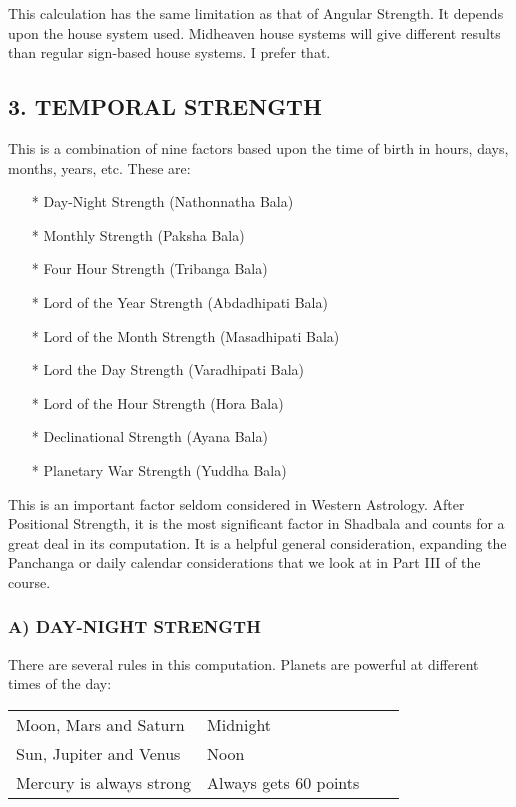This calculation has the same limitation as that of Angular Strength. It depends upon the house system used. Midheaven house systems will give different results than regular sign-based house systems. I prefer that.

 


\subsection{3. TEMPORAL STRENGTH}
 

This is a combination of nine factors based upon the time of birth in hours, days, months, years, etc.   These are:

 

\begin{enumerate}
\item[*] Day-Night Strength (Nathonnatha Bala)
\item[*] Monthly Strength (Paksha Bala)
\item[*] Four Hour Strength (Tribanga Bala)
\item[*] Lord of the Year Strength (Abdadhipati Bala)
\item[*] Lord of the Month Strength (Masadhipati Bala)
\item[*] Lord the Day Strength (Varadhipati Bala)
\item[*] Lord of the Hour Strength (Hora Bala)
\item[*] Declinational Strength (Ayana Bala)
\item[*] Planetary War Strength (Yuddha Bala)
 \end{enumerate}

This is an important factor seldom considered in Western Astrology. After Positional Strength, it is the most significant factor in Shadbala and counts for a great deal in its computation. It is a helpful general consideration, expanding the Panchanga or daily calendar considerations that we look at in Part III of the course.

 

\subsubsection{A) DAY-NIGHT STRENGTH}

 

There are several rules in this computation. Planets are powerful at different times of the day:

 
\begin{center}
\begin{tabular}{ l l l l}
Moon, Mars and Saturn	 & Midnight           \\
Sun, Jupiter and Venus	  &Noon           \\
Mercury is always strong	  &Always gets 60 points           \\
   \end{tabular}
\end{center}

